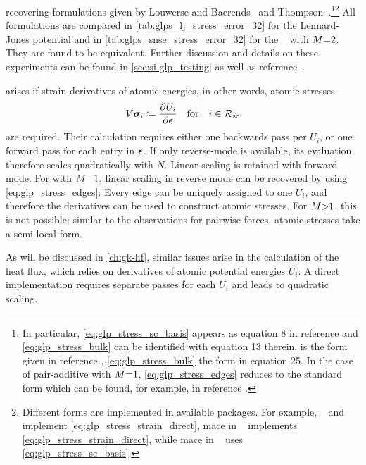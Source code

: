 recovering formulations given by Louwerse and Baerends~\cite{lb2006p} and Thompson~\cite{tpm2009t}.\footnote[][-2\baselineskip]{In particular, \cref{eq:glp_stress_sc_basis} appears as equation 8 in reference \cite{lb2006p} and \cref{eq:glp_stress_bulk} can be identified with equation 13 therein.  is the  form given in reference \cite[eq.~27]{tpm2009t}, \cref{eq:glp_stress_bulk} the  form in equation 25. In the case of pair-additive \glps with $M{=}1$, \cref{eq:glp_stress_edges} reduces to the standard form which can be found, for example, in reference \cite[eq.~2]{lb2006p}.
}\footnote{
    Different forms are implemented in available \mlp packages. For example, \schnetpack~\cite{sktm2019q,schnetpack} and \nequip~\cite{bmsk2022q,nequip} implement \cref{eq:glp_stress_strain_direct}, \gls{mace} in ~\cite{mace-torch} implements \cref{eq:glp_stress_strain_direct}, while \gls{mace} in ~\cite{mace-jax} uses \cref{eq:glp_stress_sc_basis}.
} All formulations are compared in \cref{tab:glps_lj_stress_error_32} for the Lennard-Jones potential and in \cref{tab:glps_snse_stress_error_32} for the \sok~\cite{fum2022q} \glp with $M{=}2$. They are found to be equivalent. Further discussion and details on these experiments can be found in \cref{sec:si-glp_testing} as well as reference~\cite{lfk2023a}.

 arises if strain derivatives of atomic energies, in other words, atomic stresses
\begin{equation}
    V \boldsymbol{\sigma}_i \coloneqq \frac{\partial U_i}{\partial \boldsymbol{\epsilon}} \quad \text{for} \quad i \in \mathcal{R_{\text{sc}}}
\end{equation}
are required.
Their calculation requires either one backwards pass per $U_i$, or one forward pass for each entry in $\boldsymbol{\epsilon}$. If only reverse-mode \ad is available, its evaluation therefore scales quadratically with $N$.  Linear scaling is retained with forward mode. 
For \glps with $M{=}1$, linear scaling in reverse mode can be recovered by using \cref{eq:glp_stress_edges}: Every edge can be uniquely assigned to one $U_i$, and therefore the derivatives can be used to construct atomic stresses. For $M{>}1$, this is not possible; similar to the observations for pairwise forces, atomic stresses take a semi-local form.

As will be discussed in \cref{ch:gk-hf}, similar issues arise in the calculation of the heat flux, which relies on derivatives of atomic potential energies $U_i$: A direct implementation requires separate \ad passes for each $U_i$ and leads to quadratic scaling.

